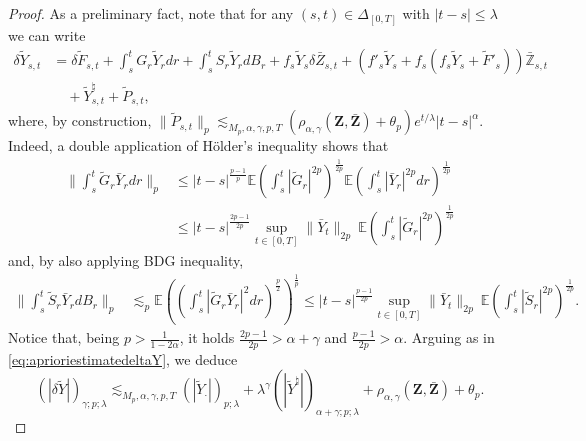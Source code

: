 \documentclass[11pt,a4paper]{article}
\newcommand{\E}{\mathbb{E}}
\theoremstyle{plain}
\begin{document}
\begin{proof}
As a preliminary fact, note that for any $(s,t) \in \Delta_{[0,T]}$ with $|t-s| \le \lambda$ we can write \begin{equation*}
    \begin{aligned}
        \delta{\tilde{Y}}_{s,t} &= 
        \delta \tilde{F}_{s,t} + \int_s^t G_r\tilde{Y}_rdr + \int_s^t S_r\tilde{Y}_rdB_r  +  f_s\tilde{Y}_s\delta \bar{Z}_{s,t}+ (f'_s\tilde{Y}_s+f_s(f_s\tilde{Y}_s+\tilde{F}'_s))\bar{\mathbb{Z}}_{s,t} \\ & \quad + \tilde{Y}^\natural_{s,t} + \tilde{P}_{s,t},
    \end{aligned}
\end{equation*} 
where, by construction,  $\|\tilde{P}_{s,t}\|_p \lesssim_{M_p,\alpha,\gamma,p,T} (\rho_{\alpha,\gamma}(\mathbf{Z},\bar{\mathbf{Z}}) + \theta_p) e^{t/\lambda}|t-s|^\alpha$.
Indeed, a double application of H\"older's inequality shows that \begin{equation*}
    \begin{aligned}
        \|\int_s^t \tilde{G}_r \bar{Y}_r dr\|_p & 
        \le |t-s|^\frac{p-1}{p} \E(\int_s^t |\tilde{G}_r|^{2p})^\frac{1}{2p} \E(\int_s^t|\bar{Y}_r|^{2p} dr)^\frac{1}{2p} \\ & \le |t-s|^\frac{2p-1}{2p} \sup_{t \in [0,T]} \|\bar{Y}_t\|_{2p} \ \E(\int_s^t |\tilde{G}_r|^{2p})^\frac{1}{2p}
    \end{aligned}
\end{equation*}
and, by also applying BDG inequality, \begin{equation*}
    \begin{aligned}
        \|\int_s^t \tilde{S}_r \bar{Y}_r dB_r\|_p & 
        \lesssim_p \E( (\int_s^t |\tilde{G}_r \bar{Y}_r|^2 dr)^{\frac{p}{2}})^\frac{1}{p} 
        \le |t-s|^\frac{p-1}{2p} \sup_{t \in [0,T]} \|\bar{Y}_t\|_{2p} \ \E(\int_s^t |\tilde{S}_r|^{2p})^\frac{1}{2p}.
    \end{aligned}
\end{equation*}
Notice that, being $p > \frac{1}{1-2\alpha}$, it holds $\frac{2p-1}{2p}>\alpha+\gamma$ and $\frac{p-1}{2p}>\alpha$.
Arguing as in \eqref{eq:aprioriestimatedeltaY}, we deduce \begin{equation*}
    (|\delta \tilde{Y}|)_{\gamma;p;\lambda} \lesssim_{M_p,\alpha,\gamma,p,T}  (|\tilde{Y}_\cdot|)_{p;\lambda} + \lambda^\gamma(|\tilde{Y}^\natural|)_{\alpha+\gamma;p;\lambda} + \rho_{\alpha,\gamma}(\mathbf{Z},\bar{\mathbf{Z}}) + \theta_p. 

\end{equation*}
\end{proof}
\end{document}
